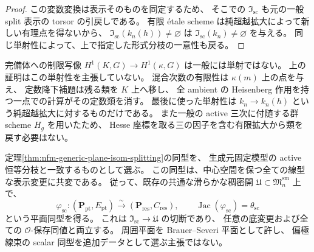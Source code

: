 \begin{proof}
この変数変換は表示そのものを同定するため、
そこでの $\mathfrak I_{\mathrm{sc}}$ も元の一般 split 表示の torsor の引戻しである。
有限 \'etale scheme は純超越拡大によって新しい有理点を得ないから、
$\mathfrak I_{\mathrm{sc}}(k_n(h))\ne\varnothing$ は
$\mathfrak I_{\mathrm{sc}}(k_n)\ne\varnothing$ を与える。
同じ単射性によって、上で指定した形式分枝の一意性も戻る。
\end{proof}

\begin{remark}[形式的分裂からの降下と三つの役割]
完備体への制限写像 $H^1(K,G)\to H^1(\kappa,G)$ は一般には単射ではない。
上の証明はこの単射性を主張していない。
混合次数の有限性は $\kappa(m)$ 上の点を与え、
定数降下補題は残る類を $K$ 上へ移し、
全 ambient の Heisenberg 作用を持つ一点での計算がその定数類を消す。
最後に使った単射性は $k_n\to k_n(h)$ という純超越拡大に対するものだけである。
また一般の active 三次に付随する群 scheme $H_g$ を用いたため、
Hesse 座標を取る三の因子を含む有限拡大から類を戻す必要はない。
\end{remark}

\begin{proposition}[半古典平面同型の表示変更と全 O-降下]
\label{prop:nfm-semiclassical-plane-isom-descent}
定理\ref{thm:nfm-generic-plane-isom-splitting}の同型を、
生成元固定模型の active 恒等分枝と一致するものとして選ぶ。
この同型は、中心空間を保つ全ての線型な表示変更に共変である。
従って、既存の共通な滑らかな稠密開
$\mathfrak U\subset\mathfrak M_n^{\mathrm{sm}}$ 上で、
\[
 \varphi_{\mathrm{sc}}:
  (\mathbf P_{\mathrm{pt}},E_{\mathrm{pt}})
    \xrightarrow{\sim}
  (\mathbf P_{\mathrm{res}},C_{\mathrm{res}}),
 \qquad\operatorname{Jac}(\varphi_{\mathrm{sc}})=\theta_{\mathrm{sc}}
\]
という平面同型を得る。
これは $\mathfrak I_{\mathrm{sc}}\to\mathfrak U$ の切断であり、
任意の底変更および全ての $\mathcal O$-保存同値と両立する。
周囲平面を Brauer--Severi 平面として許し、
偏極線束の scalar 同型を追加データとして選ぶ主張ではない。
\end{proposition}

